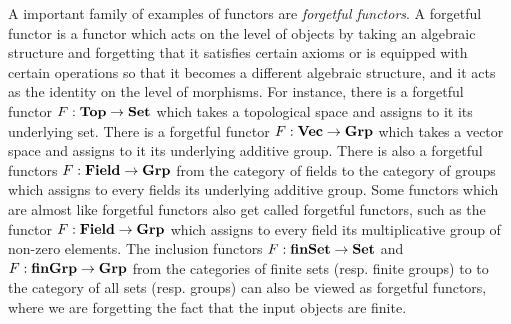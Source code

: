 \begin{ex} A important family of examples of functors are {\em forgetful functors}. A forgetful functor is a functor which acts on the level of objects by taking an algebraic structure and forgetting that it satisfies certain axioms or is equipped with certain operations so that it becomes a different algebraic structure, and it acts as the identity on the level of morphisms. For instance, there is a forgetful functor $F:{\bf Top}\to{\bf Set}$ which takes a topological space and assigns to it its underlying set. There is a forgetful functor $F:{\bf Vec}\to{\bf Grp}$ which takes a vector space and assigns to it its underlying additive group. There is also a forgetful functors $F:{\bf Field}\to {\bf Grp}$ from the category of fields to the category of groups which assigns to every fields its underlying additive group. Some functors which are almost like forgetful functors also get called forgetful functors, such as the functor $F:{\bf Field}\to{\bf Grp}$ which assigns to every field its multiplicative group of non-zero elements. The inclusion functors $F:{\bf finSet}\to {\bf Set}$ and $F:{\bf finGrp}\to{\bf Grp}$ from the categories of finite sets (resp. finite groups) to to the category of all sets (resp. groups) can also be viewed as forgetful functors, where we are forgetting the fact that the input objects are finite.
\end{ex}

